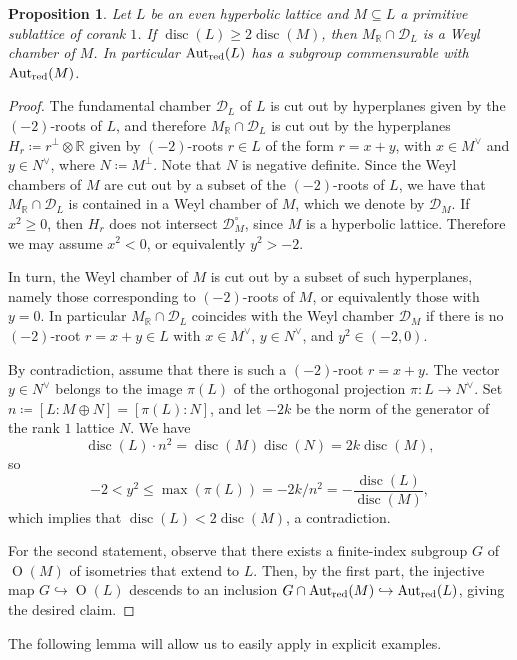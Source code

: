 \documentclass[11pt,letterpaper]{amsart}
\DeclareMathOperator{\Aut}{Aut}
\DeclareMathOperator{\disc}{disc}
\DeclareMathOperator{\Or}{O}
\newcommand{\RR}{\mathbb{R}}
\newcommand{\AutredL}{\Aut_{\rm red}(L)}
\newcommand{\AutredM}{\Aut_{\rm red}(M)}
\newcommand{\D}{\mathcal{D}}
\newtheorem{proposition}[theorem]{Proposition}
\theoremstyle{definition}
\theoremstyle{remark}
\begin{document}
\begin{proposition}\label{prop:easy_fundamental_chamber}
Let $L$ be an even hyperbolic lattice and $M\subseteq L$ a primitive sublattice of corank $1$. If $\disc(L)\ge 2\disc(M)$, then $M_\RR \cap \D_{L}$ is a Weyl chamber of $M$. In particular $\AutredL$ has a subgroup commensurable with $\AutredM$.
\end{proposition}
\begin{proof}
The fundamental chamber $\D_L$ of $L$ is cut out by hyperplanes given by the $(-2)$-roots of $L$, and therefore $M_\RR \cap \D_{L}$ is cut out by the hyperplanes $H_r \coloneqq r^\perp\otimes \RR$ given by $(-2)$-roots $r\in L$ of the form $r=x+y$, with $x\in M^\vee$ and $y\in N^\vee$, where $N\coloneqq M^\perp$. Note that $N$ is negative definite.
Since the Weyl chambers of $M$ are cut out by a subset of the $(-2)$-roots of $L$, we have that $M_\RR \cap \D_L$ is contained in a Weyl chamber of $M$, which we denote by $\D_M$.
If $x^2 \ge 0$, then $H_r$ does not intersect $\D_{M}^\circ$, since $M$ is a hyperbolic lattice. Therefore we may assume $x^2 < 0$, or equivalently $y^2>-2$.

In turn, the Weyl chamber of $M$ is cut out by a subset of such hyperplanes, namely those corresponding to $(-2)$-roots of $M$, or equivalently those with $y=0$. In particular $M_\RR \cap \D_{L}$ coincides with the Weyl chamber $\D_M$ if there is no $(-2)$-root $r=x+y\in L$ with $x\in M^\vee$, $y\in N^\vee$, and $y^2 \in (-2,0)$.

By contradiction, assume that there is such a $(-2)$-root $r=x+y$. The vector $y\in N^\vee$ belongs to the image $\pi(L)$ of the orthogonal projection $\pi: L \to N^\vee$. Set $n\coloneqq [L:M\oplus N] = [\pi(L):N]$, and let $-2k$ be the norm of the generator of the rank $1$ lattice $N$. We have \[\disc(L)\cdot n^2 = \disc(M)\disc(N)=2k \disc(M),\] so
$$-2 < y^2 \le \max(\pi(L)) = -2k/n^2  = -\frac{\disc(L)}{\disc(M)},$$
which implies that $\disc(L)< 2\disc(M)$, a contradiction.

For the second statement, observe that there exists a finite-index subgroup $G$ of $\Or(M)$ of isometries that extend to $L$. Then, by the first part, the injective map $G\hookrightarrow \Or(L)$ descends to an inclusion $G \cap \AutredM\hookrightarrow \AutredL$, giving the desired claim.
\end{proof}

The following lemma will allow us to easily apply  in explicit examples.
\end{document}
